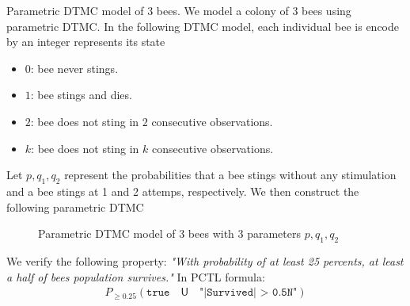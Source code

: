 \begin{example}{Parametric DTMC model of 3 bees.}
    We model a colony of 3 bees using parametric DTMC. In the following DTMC model, each individual
    bee is encode by an integer represents its state
    \begin{itemize}
        \item $0$: bee never stings.
        \item $1$: bee stings and dies.
        \item $2$: bee does not sting in $2$ consecutive observations.
        \item $k$: bee does not sting in $k$ consecutive observations.
    \end{itemize}
    Let $p, q_1, q_2$ represent the probabilities that a bee stings without any stimulation and a
    bee stings at 1 and 2 attemps, respectively. We then construct the following parametric DTMC
    \begin{figure}[H]
        \centering
        \caption{Parametric DTMC model of 3 bees with 3 parameters $p, q_1, q_2$}
    \end{figure}
\end{example}
We verify the following property: \textit{"With probability of at least 25 percents, at least a half
    of bees population survives."} In PCTL formula:
\begin{align*}
    P_{\geq 0.25} ( \texttt{true} \quad \mathsf{U} \quad \texttt{"|Survived| > 0.5N"} )
\end{align*}

